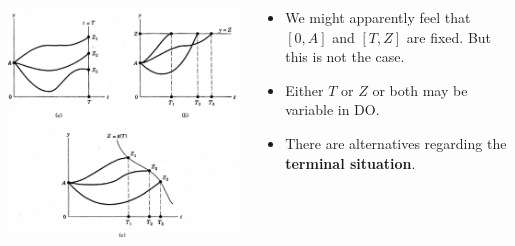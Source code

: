 \documentclass[
  ignorenonframetext,
]{beamer}
\providecommand{\tightlist}{%
  \setlength{\itemsep}{0pt}\setlength{\parskip}{0pt}}\usepackage{longtable,booktabs,array}
\begin{document}
\begin{frame}{}
\label{section-4}
\begin{columns}[T]
\begin{column}{0.6\textwidth}
\includegraphics[width=2\textwidth,height=\textheight]{images/do_variable.png}
\end{column}

\begin{column}{0.4\textwidth}
\begin{itemize}
\tightlist
\item
  We might apparently feel that \([0, A]\) and \([T, Z]\) are fixed. But
  this is not the case.
\item
  Either \(T\) or \(Z\) or both may be variable in DO.
\item
  There are alternatives regarding the \textbf{terminal situation}.
\end{itemize}
\end{column}
\end{columns}
\end{frame}
\end{document}
